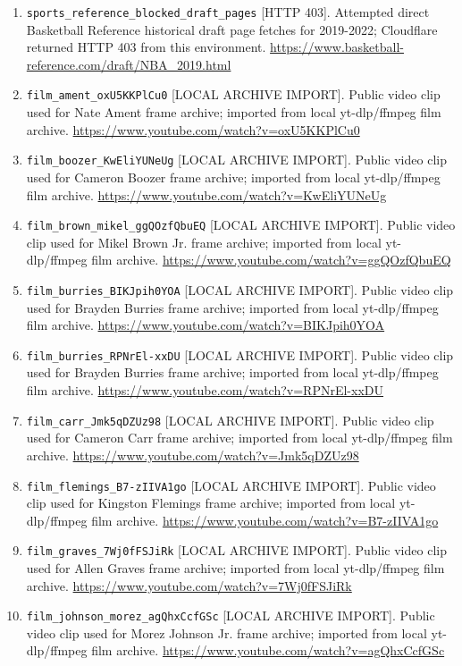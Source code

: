 \documentclass[11pt]{article}
\begin{document}
\begin{enumerate}[leftmargin=*, itemsep=2pt]
\item \texttt{sports\_reference\_blocked\_draft\_pages} [HTTP 403]. Attempted direct Basketball Reference historical draft page fetches for 2019-2022; Cloudflare returned HTTP 403 from this environment. \url{https://www.basketball-reference.com/draft/NBA_2019.html}
\item \texttt{film\_ament\_oxU5KKPlCu0} [LOCAL ARCHIVE IMPORT]. Public video clip used for Nate Ament frame archive; imported from local yt-dlp/ffmpeg film archive. \url{https://www.youtube.com/watch?v=oxU5KKPlCu0}
\item \texttt{film\_boozer\_KwEliYUNeUg} [LOCAL ARCHIVE IMPORT]. Public video clip used for Cameron Boozer frame archive; imported from local yt-dlp/ffmpeg film archive. \url{https://www.youtube.com/watch?v=KwEliYUNeUg}
\item \texttt{film\_brown\_mikel\_ggQOzfQbuEQ} [LOCAL ARCHIVE IMPORT]. Public video clip used for Mikel Brown Jr. frame archive; imported from local yt-dlp/ffmpeg film archive. \url{https://www.youtube.com/watch?v=ggQOzfQbuEQ}
\item \texttt{film\_burries\_BIKJpih0YOA} [LOCAL ARCHIVE IMPORT]. Public video clip used for Brayden Burries frame archive; imported from local yt-dlp/ffmpeg film archive. \url{https://www.youtube.com/watch?v=BIKJpih0YOA}
\item \texttt{film\_burries\_RPNrEl-xxDU} [LOCAL ARCHIVE IMPORT]. Public video clip used for Brayden Burries frame archive; imported from local yt-dlp/ffmpeg film archive. \url{https://www.youtube.com/watch?v=RPNrEl-xxDU}
\item \texttt{film\_carr\_Jmk5qDZUz98} [LOCAL ARCHIVE IMPORT]. Public video clip used for Cameron Carr frame archive; imported from local yt-dlp/ffmpeg film archive. \url{https://www.youtube.com/watch?v=Jmk5qDZUz98}
\item \texttt{film\_flemings\_B7-zIIVA1go} [LOCAL ARCHIVE IMPORT]. Public video clip used for Kingston Flemings frame archive; imported from local yt-dlp/ffmpeg film archive. \url{https://www.youtube.com/watch?v=B7-zIIVA1go}
\item \texttt{film\_graves\_7Wj0fFSJiRk} [LOCAL ARCHIVE IMPORT]. Public video clip used for Allen Graves frame archive; imported from local yt-dlp/ffmpeg film archive. \url{https://www.youtube.com/watch?v=7Wj0fFSJiRk}
\item \texttt{film\_johnson\_morez\_agQhxCcfGSc} [LOCAL ARCHIVE IMPORT]. Public video clip used for Morez Johnson Jr. frame archive; imported from local yt-dlp/ffmpeg film archive. \url{https://www.youtube.com/watch?v=agQhxCcfGSc}

\end{enumerate}
\end{document}
